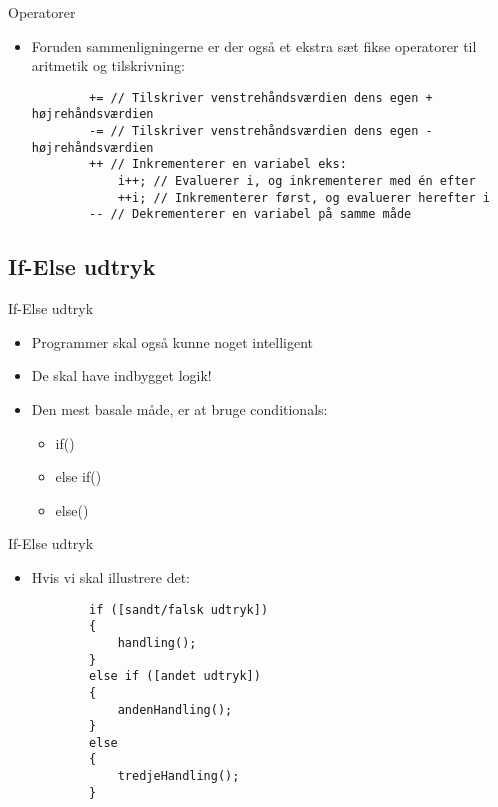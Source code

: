 \documentclass{beamer}
\begin{document}
\begin{frame}[fragile]{Operatorer}
	\begin{itemize}
		\item{Foruden sammenligningerne er der også et ekstra sæt fikse operatorer til aritmetik og tilskrivning:}
		\begin{lstlisting}
		+= // Tilskriver venstrehåndsværdien dens egen + højrehåndsværdien
		-= // Tilskriver venstrehåndsværdien dens egen - højrehåndsværdien
		++ // Inkrementerer en variabel eks:
			i++; // Evaluerer i, og inkrementerer med én efter
			++i; // Inkrementerer først, og evaluerer herefter i
		-- // Dekrementerer en variabel på samme måde
		\end{lstlisting}
	\end{itemize}
\end{frame}

\subsection{If-Else udtryk}

\begin{frame}[fragile]{If-Else udtryk}
	\begin{itemize}
		\item{Programmer skal også kunne noget intelligent}
		\item{De skal have indbygget logik!}
		\item{Den mest basale måde, er at bruge conditionals:}
		\begin{itemize}
			\item{{\color{C_darkblue}if}()}
			\item{{\color{C_darkblue}else if}()}
			\item{{\color{C_darkblue}else}()}
		\end{itemize}
	\end{itemize}
\end{frame}


\begin{frame}[fragile]{If-Else udtryk}
	\begin{itemize}
		\item{Hvis vi skal illustrere det:}
		\begin{lstlisting}
		if ([sandt/falsk udtryk])
		{
			handling();
		}
		else if ([andet udtryk])
		{
			andenHandling();
		}
		else
		{
			tredjeHandling();
		}
		\end{lstlisting}
	\end{itemize}
\end{frame}
\end{document}

